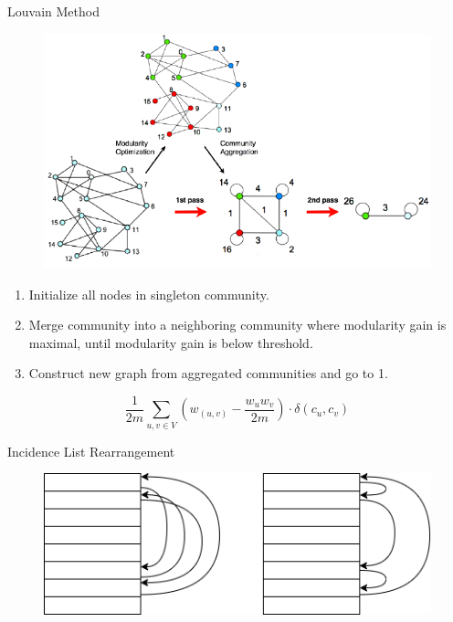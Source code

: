 \documentclass[rgb]{beamer}
\begin{document}
        \begin{frame}[allowframebreaks]{Louvain Method}
            \begin{figure}
                \begin{center}
                \includegraphics[keepaspectratio, height=0.8\textheight, width=.8\textwidth]{img/louvain.png}
                \end{center}
            \end{figure}
            
            \framebreak
            
            \begin{enumerate}
             \item Initialize all nodes in singleton community.
             \item Merge community into a neighboring community where modularity gain is maximal, until modularity gain is below threshold.
             \item Construct new graph from aggregated communities and go to 1.
            \end{enumerate}
            \vspace{2em}
            \[ \frac{1}{2m} \sum_{u,v \in V} \left( w_{(u, v)} - \frac{w_u w_v}{2m} \right) \cdot \delta (c_u, c_v) \]
            
        \end{frame}
    
        \begin{frame}{Incidence List Rearrangement}
            \begin{figure}
                \begin{center}
                    \includegraphics[keepaspectratio, height=0.6\textheight, width=.6\textwidth]{img/incl.png}
                \end{center}
            \end{figure}
        \end{frame}
        
\end{document}
